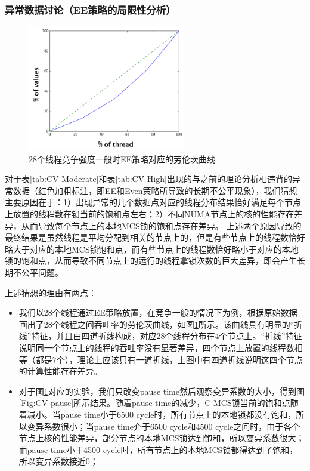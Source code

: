 \subsubsection{异常数据讨论（EE策略的局限性分析）}

\begin{figure}[t]
	\centering
	\includegraphics[height=5.5cm]{figure/Even-moderate-28.png}
	\caption{28个线程竞争强度一般时EE策略对应的劳伦茨曲线}
	\label{Fig:Even-moderate-28}
\end{figure}

对于表\ref{tab:CV-Moderate}和表\ref{tab:CV-High}出现的与之前的理论分析相违背的异常数据（红色加粗标注，即EE和Even策略所导致的长期不公平现象），我们猜想主要原因在于：1）出现异常的几个数据点对应的线程分布结果恰好满足每个节点上放置的线程数在锁当前的饱和点左右；2）不同NUMA节点上的核的性能存在差异，从而导致每个节点上的本地MCS锁的饱和点存在差异。
上述两个原因导致的最终结果是虽然线程是平均分配到相关的节点上的，但是有些节点上的线程数恰好略大于对应的本地MCS锁饱和点，而有些节点上的线程数恰好略小于对应的本地锁的饱和点，从而导致不同节点上的运行的线程拿锁次数的巨大差异，即会产生长期不公平问题。

上述猜想的理由有两点：
\begin{itemize}
    \item 我们以28个线程通过EE策略放置，在竞争一般的情况下为例，根据原始数据画出了28个线程之间吞吐率的劳伦茨曲线，如图\ref{Fig:Even-moderate-28}所示。该曲线具有明显的“折线”特征，并且由四道折线构成，对应28个线程分布在4个节点上。“折线”特征说明同一个节点上的线程的吞吐率没有显著差异，四个节点上放置的线程数相等（都是7个），理论上应该只有一道折线，上图中有四道折线说明这四个节点的计算性能存在差异。
    \item 对于图\ref{Fig:Even-moderate-28}对应的实验，我们只改变pause time然后观察变异系数的大小，得到图\ref{Fig:CV-pause}所示结果。随着pause time的减少，C-MCS锁当前的饱和点随着减小。当pause time小于6500 cycle时，所有节点上的本地锁都没有饱和，所以变异系数很小；当pause time介于6500 cycle和4500 cycle之间时，由于各个节点上核的性能差异，部分节点的本地MCS锁达到饱和，所以变异系数很大；而pause time小于4500 cycle时，所有节点上的本地MCS锁都得达到了饱和，所以变异系数接近0；
\end{itemize}

